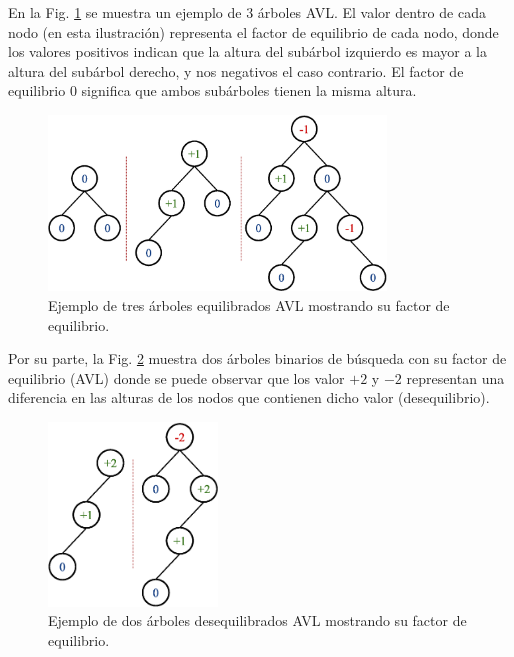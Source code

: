 En la Fig. \ref{fig:AVLExample1} se muestra un ejemplo de 3 árboles AVL. El valor dentro de cada nodo (en esta ilustración) representa el factor de equilibrio de cada nodo, donde los valores positivos indican que la altura del subárbol izquierdo es mayor a la altura del subárbol derecho, y nos negativos el caso contrario. El factor de equilibrio 0 significa que ambos subárboles tienen la misma altura. 

\begin{figure}[htpb!]
  \begin{center}
    \includegraphics[width=0.8\textwidth]{images/AVLExample1.eps}
  \end{center}
  \caption{Ejemplo de tres árboles equilibrados AVL mostrando su factor de equilibrio.}
  \label{fig:AVLExample1}
\end{figure}

Por su parte, la Fig. \ref{fig:AVLExample2} muestra dos árboles binarios de búsqueda con su factor de equilibrio (AVL) donde se puede observar que los valor $+2$ y $-2$ representan una diferencia en las alturas de los nodos que contienen dicho valor (desequilibrio).

\begin{figure}[htpb!]
  \begin{center}
    \includegraphics[width=0.4\textwidth]{images/AVLExample2.eps}
  \end{center}
  \caption{Ejemplo de dos árboles desequilibrados AVL mostrando su factor de equilibrio.}
  \label{fig:AVLExample2}
\end{figure}

